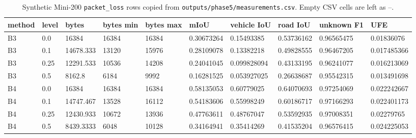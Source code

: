 \begin{table}[t]
\centering
\caption{Synthetic Mini-200 \texttt{packet\_loss} rows copied from \texttt{outputs/phase5/measurements.csv}. Empty CSV cells are left as --.}
\label{tab:packet_loss}
\scriptsize
\setlength{\tabcolsep}{3pt}
\begin{tabular}{llllllllll}
\toprule
method & level & bytes & bytes min & bytes max & mIoU & vehicle IoU & road IoU & unknown F1 & UFE \\
\midrule
B3 & 0.0 & 16384 & 16384 & 16384 & 0.30673264 & 0.15493385 & 0.53736162 & 0.96565475 & 0.01836076 \\
B3 & 0.1 & 14678.333 & 13120 & 15976 & 0.28109078 & 0.13382218 & 0.49828555 & 0.96467205 & 0.017485366 \\
B3 & 0.25 & 12291.533 & 10536 & 14208 & 0.24041045 & 0.099828094 & 0.43133195 & 0.96241077 & 0.016213069 \\
B3 & 0.5 & 8162.8 & 6184 & 9992 & 0.16281525 & 0.053927025 & 0.26638687 & 0.95542315 & 0.013491698 \\
B4 & 0.0 & 16384 & 16384 & 16384 & 0.58135053 & 0.60779025 & 0.64070693 & 0.97254069 & 0.022242667 \\
B4 & 0.1 & 14747.467 & 13528 & 16112 & 0.54183606 & 0.55998249 & 0.60186717 & 0.97166293 & 0.022401173 \\
B4 & 0.25 & 12430.933 & 10672 & 13936 & 0.47763611 & 0.48767047 & 0.53592935 & 0.97008351 & 0.02279765 \\
B4 & 0.5 & 8439.3333 & 6048 & 10128 & 0.34164941 & 0.35414269 & 0.41535204 & 0.96576415 & 0.024225053 \\
\bottomrule
\end{tabular}
\end{table}
